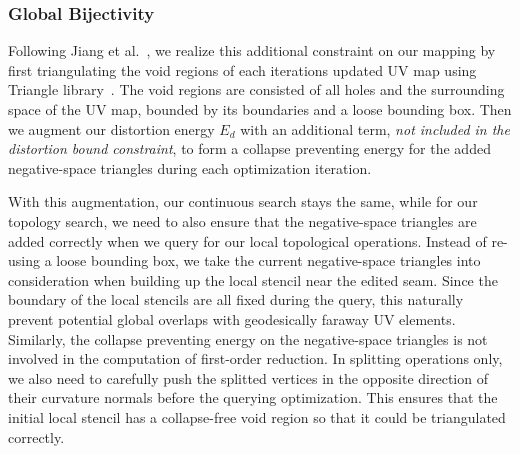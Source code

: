 \subsubsection{Global Bijectivity}
\label{sec:bijectivity}
Following Jiang et al.\ , we realize this additional constraint on our mapping by first triangulating the void regions of each iterations updated UV map using Triangle library\ \cite{Triangle_Engineering_a_2D_quality_mesh_generator_and_Delaunay_triangulator}. The void regions are consisted of all holes and the surrounding space of the UV map, bounded by its boundaries and a loose bounding box.
Then we augment our distortion energy $E_d$ with an additional term, \emph{not included in the distortion bound constraint}, to form a collapse preventing energy for the added negative-space triangles during each optimization iteration.

With this augmentation, our continuous search stays the same, while for our topology search, we need to also ensure that the negative-space triangles are added correctly when we query for our local topological operations.
Instead of re-using a loose bounding box, we take the current negative-space triangles into consideration when building up the local stencil near the edited seam. Since the boundary of the local stencils are all fixed during the query, this naturally prevent potential global overlaps with geodesically faraway UV elements. Similarly, the collapse preventing energy on the negative-space triangles is not involved in the computation of first-order reduction.
In splitting operations only, we also need to carefully push the splitted vertices in the opposite direction of their curvature normals before the querying optimization. This ensures that the initial local stencil has a collapse-free void region so that it could be triangulated correctly.



